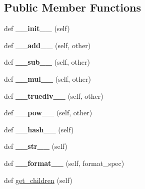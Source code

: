 \subsection*{Public Member Functions}
\begin{DoxyCompactItemize}
\item 
\mbox{\label{classsrc_1_1node_1_1Node_a933de5ee7e799d2538da89c0bdb1f67c}} 
def {\bfseries \+\_\+\+\_\+init\+\_\+\+\_\+} (self)
\item 
\mbox{\label{classsrc_1_1node_1_1Node_a55e38c6599bc88e7488c9afbb7eaa100}} 
def {\bfseries \+\_\+\+\_\+add\+\_\+\+\_\+} (self, other)
\item 
\mbox{\label{classsrc_1_1node_1_1Node_aee34af65ac3e10545f3615b2239ba8a6}} 
def {\bfseries \+\_\+\+\_\+sub\+\_\+\+\_\+} (self, other)
\item 
\mbox{\label{classsrc_1_1node_1_1Node_a93320354a3b0a110a70849690e38c8ae}} 
def {\bfseries \+\_\+\+\_\+mul\+\_\+\+\_\+} (self, other)
\item 
\mbox{\label{classsrc_1_1node_1_1Node_a9e54c9ae0209f7810fd476b7858a9f96}} 
def {\bfseries \+\_\+\+\_\+truediv\+\_\+\+\_\+} (self, other)
\item 
\mbox{\label{classsrc_1_1node_1_1Node_ac9c4ad81dff8293294cb2595d26f7e5c}} 
def {\bfseries \+\_\+\+\_\+pow\+\_\+\+\_\+} (self, other)
\item 
\mbox{\label{classsrc_1_1node_1_1Node_ad67a6d5e78b7221fb36d43b1e32f8abb}} 
def {\bfseries \+\_\+\+\_\+hash\+\_\+\+\_\+} (self)
\item 
\mbox{\label{classsrc_1_1node_1_1Node_a4597de2c85ad4dac161259e55d8effb3}} 
def {\bfseries \+\_\+\+\_\+str\+\_\+\+\_\+} (self)
\item 
\mbox{\label{classsrc_1_1node_1_1Node_a552690bac0476fac1be3dbeb93a8f358}} 
def {\bfseries \+\_\+\+\_\+format\+\_\+\+\_\+} (self, format\+\_\+spec)
\item 
def \mbox{\hyperlink{classsrc_1_1node_1_1Node_a756ae69f487fdee0a12e5f462d805c3e}{get\+\_\+children}} (self)

\end{DoxyCompactItemize}
